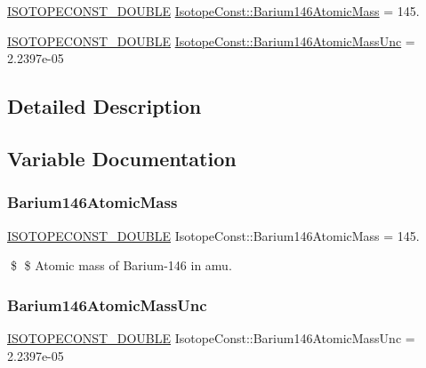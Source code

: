 \begin{DoxyCompactItemize}
\item 
\mbox{\hyperlink{group___isotope_const-_macros_ga8f45a7272ce02c0b4c65c44636ed719a}{I\+S\+O\+T\+O\+P\+E\+C\+O\+N\+S\+T\+\_\+\+D\+O\+U\+B\+LE}} \mbox{\hyperlink{group___isotope_const-_barium-_ba146_ga77b8f1d49003570888d83ec5b5b7637c}{Isotope\+Const\+::\+Barium146\+Atomic\+Mass}} = 145.
\item 
\mbox{\hyperlink{group___isotope_const-_macros_ga8f45a7272ce02c0b4c65c44636ed719a}{I\+S\+O\+T\+O\+P\+E\+C\+O\+N\+S\+T\+\_\+\+D\+O\+U\+B\+LE}} \mbox{\hyperlink{group___isotope_const-_barium-_ba146_gac7bda9e520ca3ca868f73ca7080c26a6}{Isotope\+Const\+::\+Barium146\+Atomic\+Mass\+Unc}} = 2.\+2397e-\/05
\end{DoxyCompactItemize}


\subsection{Detailed Description}


\subsection{Variable Documentation}
\mbox{\label{group___isotope_const-_barium-_ba146_ga77b8f1d49003570888d83ec5b5b7637c}} 
\subsubsection{\texorpdfstring{Barium146\+Atomic\+Mass}{Barium146AtomicMass}}
{\footnotesize\ttfamily \mbox{\hyperlink{group___isotope_const-_macros_ga8f45a7272ce02c0b4c65c44636ed719a}{I\+S\+O\+T\+O\+P\+E\+C\+O\+N\+S\+T\+\_\+\+D\+O\+U\+B\+LE}} Isotope\+Const\+::\+Barium146\+Atomic\+Mass = 145.}

\$ \$ Atomic mass of Barium-\/146 in amu. \mbox{\label{group___isotope_const-_barium-_ba146_gac7bda9e520ca3ca868f73ca7080c26a6}} 
\subsubsection{\texorpdfstring{Barium146\+Atomic\+Mass\+Unc}{Barium146AtomicMassUnc}}
{\footnotesize\ttfamily \mbox{\hyperlink{group___isotope_const-_macros_ga8f45a7272ce02c0b4c65c44636ed719a}{I\+S\+O\+T\+O\+P\+E\+C\+O\+N\+S\+T\+\_\+\+D\+O\+U\+B\+LE}} Isotope\+Const\+::\+Barium146\+Atomic\+Mass\+Unc = 2.\+2397e-\/05}

